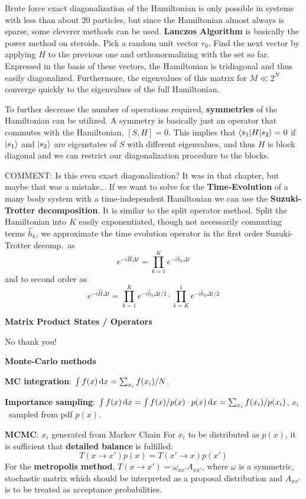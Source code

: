 \documentclass[10pt,landscape]{article}
\newcommand{\topiccolor}{green}
\newcommand{\topic}[2]{%
	\renewcommand{\topiccolor}{#1}
	\begin{tcolorbox}[boxsep=0.5mm, left=1mm, right=1mm, top=0mm, bottom=0mm,
		colback=#1!30, colframe=#1, arc is angular]%
		\centering \textbf{#2}%
	\end{tcolorbox}%
}
\newcommand{\cbf}[1]{\textcolor{\topiccolor!80!black}{\textbf{#1}}}
\begin{document}
\begin{multicols*}{3}
Brute force exact diagonalization of the Hamiltonian is only possible in
systems with less than about 20 particles, but since the Hamiltonian almost
always is sparse, some cleverer methods can be used.
\cbf{Lanczos Algorithm} is basically the power method on steroids.
Pick a random unit vector $r_0$. Find the next vector by applying $H$ to the
previous one and orthonormalizing with the set so far.
Expressed in the basis of these vectors, the Hamiltonian is tridiagonal and thus
easily diagonalized.
Furthermore, the eigenvalues of this matrix for $M \ll 2^N$ converge quickly to
the eigenvalues of the full Hamiltonian.

To further decrease the number of operations required, \cbf{symmetries} of the
Hamiltonian can be utilized.
A symmetry is basically just an operator that commutes with the Hamiltonian,
$[S,H]=0$.
This implies that $\braket{s_1|H|s_2} = 0$ if $\ket{s_1}$ and $\ket{s_2}$ are
eigenstates of $S$ with different eigenvalues, and thus $H$ is block diagonal
and we can restrict our diagonalization procedure to the blocks.

COMMENT: Is this even exact diagonalization? It was in that chapter, but maybe
that was a mistake...
If we want to solve for the \cbf{Time-Evolution} of a many body system with a
time-independent Hamiltonian we can use the \cbf{Suzuki-Trotter decomposition}.
It is similar to the split operator method.
Split the Hamiltonian into $K$ easily exponentiated, though not necessarily
commuting terms $\hat h_k$, we approximate the time evolution operator in the
first order Suzuki-Trotter decomp.\ as
\[
	e^{-i\hat H\Delta t} = \prod_{k=1}^K e^{-i\hat h_k \Delta t}
\]
and to second order as
\[
	e^{-i\hat H\Delta t} = \prod_{k=1}^K e^{-i\hat h_k \Delta t/2} \cdot
	\prod_{k=K}^1 e^{-i\hat h_k \Delta t/2}
\]

\topic{cyan}{Matrix Product States / Operators}

No thank you!

\topic{red}{Monte-Carlo methods}

\cbf{MC integration}:
$\int f(x) \dl x = \sum_{x_i} f(x_i)/N$.

\cbf{Importance sampling}:
$\int f(x) \dl x = \int f(x)/p(x) \cdot p(x) \dl x = \sum_{x_i} f(x_i) / p(x_i)$,
$x_i$ sampled from pdf $p(x)$.

\cbf{MCMC}: $x_i$ generated from Markov Chain
For $x_i$ to be distributed as $p(x)$, it is sufficient that
\cbf{detailed balance} is fulfilled:
\[
	T(x \to x') p(x) = T(x' \to x) p(x')
\]
For the \cbf{metropolis method}, $T(x \to x') = \omega_{xx'}A_{x x'}$,
where $\omega$ is a symmetric, stochastic matrix which should
be interpreted as a proposal distribution and $A_{x x'}$ is
to be treated as acceptance probabilities.


\end{multicols*}
\end{document}
